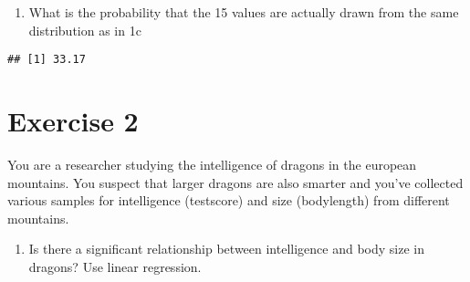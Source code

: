 \documentclass[
]{article}
\newenvironment{Shaded}{\begin{snugshade}}{\end{snugshade}}
\newcommand{\AttributeTok}[1]{\textcolor[rgb]{0.13,0.29,0.53}{#1}}
\newcommand{\CommentTok}[1]{\textcolor[rgb]{0.56,0.35,0.01}{\textit{#1}}}
\newcommand{\ConstantTok}[1]{\textcolor[rgb]{0.56,0.35,0.01}{#1}}
\newcommand{\DecValTok}[1]{\textcolor[rgb]{0.00,0.00,0.81}{#1}}
\newcommand{\FloatTok}[1]{\textcolor[rgb]{0.00,0.00,0.81}{#1}}
\newcommand{\FunctionTok}[1]{\textcolor[rgb]{0.13,0.29,0.53}{\textbf{#1}}}
\newcommand{\NormalTok}[1]{#1}
\newcommand{\OtherTok}[1]{\textcolor[rgb]{0.56,0.35,0.01}{#1}}
\newcommand{\SpecialCharTok}[1]{\textcolor[rgb]{0.81,0.36,0.00}{\textbf{#1}}}
\newcommand{\StringTok}[1]{\textcolor[rgb]{0.31,0.60,0.02}{#1}}
\providecommand{\tightlist}{%
  \setlength{\itemsep}{0pt}\setlength{\parskip}{0pt}}
\begin{document}
\begin{enumerate}
\def\labelenumi{\alph{enumi})}
\setcounter{enumi}{4}
\tightlist
\item
  What is the probability that the 15 values are actually drawn from the
  same distribution as in 1c
\end{enumerate}

\begin{Shaded}
\end{Shaded}

\begin{verbatim}
## [1] 33.17
\end{verbatim}

\hypertarget{exercise-2}{%
\section{Exercise 2}\label{exercise-2}}

You are a researcher studying the intelligence of dragons in the
european mountains. You suspect that larger dragons are also smarter and
you've collected various samples for intelligence (testscore) and size
(bodylength) from different mountains.

\begin{enumerate}
\def\labelenumi{\alph{enumi})}
\tightlist
\item
  Is there a significant relationship between intelligence and body size
  in dragons? Use linear regression.
\end{enumerate}

\begin{Shaded}
\end{Shaded}
\end{document}

